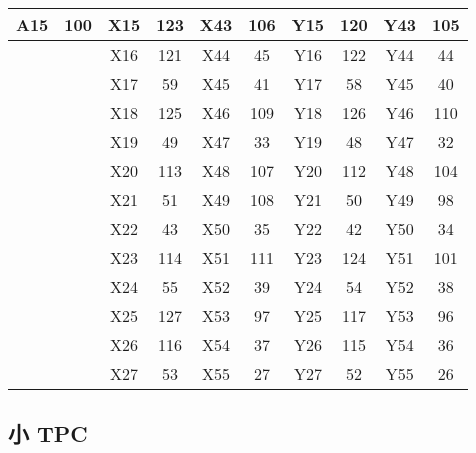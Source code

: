 {\begin{tabular}{|c|c|c|c|c|c|c|c|c|c|}
  A15    & 100    & X15    & 123    & X43    & 106    & Y15    & 120    & Y43    & 105    \\ \hline
          &        & X16    & 121    & X44    & 45     & Y16    & 122    & Y44    & 44     \\ \hline
          &        & X17    & 59     & X45    & 41     & Y17    & 58     & Y45    & 40     \\ \hline
          &        & X18    & 125    & X46    & 109    & Y18    & 126    & Y46    & 110    \\ \hline
          &        & X19    & 49     & X47    & 33     & Y19    & 48     & Y47    & 32     \\ \hline
          &        & X20    & 113    & X48    & 107    & Y20    & 112    & Y48    & 104    \\ \hline
          &        & X21    & 51     & X49    & 108    & Y21    & 50     & Y49    & 98     \\ \hline
          &        & X22    & 43     & X50    & 35     & Y22    & 42     & Y50    & 34     \\ \hline
          &        & X23    & 114    & X51    & 111    & Y23    & 124    & Y51    & 101    \\ \hline
          &        & X24    & 55     & X52    & 39     & Y24    & 54     & Y52    & 38     \\ \hline
          &        & X25    & 127    & X53    & 97     & Y25    & 117    & Y53    & 96     \\ \hline
          &        & X26    & 116    & X54    & 37     & Y26    & 115    & Y54    & 36     \\ \hline
          &        & X27    & 53     & X55    & 27     & Y27    & 52     & Y55    & 26     \\ \hline
  
  \end{tabular}
}

\subsection{小 TPC}
